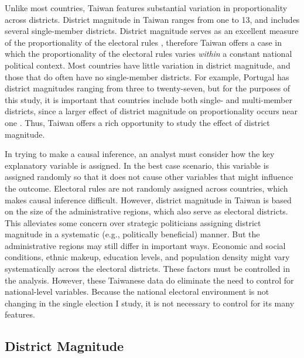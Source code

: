 \documentclass[12pt]{article}
\begin{document}
Unlike most countries, Taiwan features substantial variation in proportionality across districts. District magnitude in Taiwan ranges from one to 13, and includes several single-member districts. District magnitude serves as an excellent measure of the proportionality of the electoral rules \citep{Cox1990, Benoit2000}, therefore Taiwan offers a case in which the proportionality of the electoral rules varies \textit{within} a constant national political context. Most countries have little variation in district magnitude, and those that do often have no single-member districts. For example, Portugal has district magnitudes ranging from three to twenty-seven, but for the purposes of this study, it is important that countries include both single- and multi-member districts, since a larger effect of district magnitude on proportionality occurs near one \citep{GrofmanSelb2011}. Thus, Taiwan offers a rich opportunity to study the effect of district magnitude. 

In trying to make a causal inference, an analyst must consider how the key explanatory variable is assigned. In the best case scenario, this variable is assigned randomly so that it does not cause other variables that might influence the outcome. Electoral rules are not randomly assigned across countries, which makes causal inference difficult. However, district magnitude in Taiwan is based on the size of the administrative regions, which also serve as electoral districts. This alleviates some concern over strategic politicians assigning district magnitude in a systematic (e.g., politically beneficial) manner. But the administrative regions may still differ in important ways. Economic and social conditions, ethnic makeup, education levels, and population density might vary systematically across the electoral districts. These factors must be controlled in the analysis. However, these Taiwanese data do eliminate the need to control for national-level variables. Because the national electoral environment is not changing in the single election I study, it is not necessary to control for its many features.

\subsection*{District Magnitude} 
\end{document}
